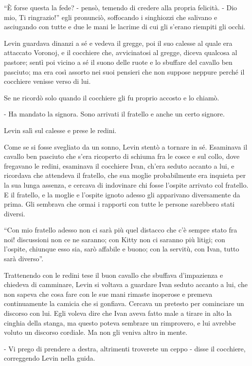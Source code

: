 ``È forse questa la fede? - pensò, temendo di credere alla propria felicità. - Dio mio, Ti ringrazio!'' egli pronunciò, soffocando i singhiozzi che salivano e asciugando con tutte e due le mani le lacrime di cui gli s'erano riempiti gli occhi. 

\label{xiv-7} 

Levin guardava dinanzi a sé e vedeva il gregge, poi il suo calesse al quale era attaccato Voronoj, e il cocchiere che, avvicinatosi al gregge, diceva qualcosa al pastore; sentì poi vicino a sé il suono delle ruote e lo sbuffare del cavallo ben pasciuto; ma era così assorto nei suoi pensieri che non suppose neppure perché il cocchiere venisse verso di lui. 

Se ne ricordò solo quando il cocchiere gli fu proprio accosto e lo chiamò. 

- Ha mandato la signora. Sono arrivati il fratello e anche un certo signore. 

Levin salì sul calesse e prese le redini. 

Come se si fosse svegliato da un sonno, Levin stentò a tornare in sé. Esaminava il cavallo ben pasciuto che s'era ricoperto di schiuma fra le cosce e sul collo, dove fregavano le redini, esaminava il cocchiere Ivan, ch'era seduto accanto a lui, e ricordava che attendeva il fratello, che sua moglie probabilmente era inquieta per la sua lunga assenza, e cercava di indovinare chi fosse l'ospite arrivato col fratello. E il fratello, e la moglie e l'ospite ignoto adesso gli apparivano diversamente da prima. Gli sembrava che ormai i rapporti con tutte le persone sarebbero stati diversi. 

``Con mio fratello adesso non ci sarà più quel distacco che c'è sempre stato fra noi! discussioni non ce ne saranno; con Kitty non ci saranno più litigi; con l'ospite, chiunque esso sia, sarò affabile e buono; con la servitù, con Ivan, tutto sarà diverso''. 

Trattenendo con le redini tese il buon cavallo che sbuffava d'impazienza e chiedeva di camminare, Levin si voltava a guardare Ivan seduto accanto a lui, che non sapeva che cosa fare con le sue mani rimaste inoperose e premeva continuamente la camicia che si gonfiava. Cercava un pretesto per cominciare un discorso con lui. Egli voleva dire che Ivan aveva fatto male a tirare in alto la cinghia della stanga, ma questo poteva sembrare un rimprovero, e lui avrebbe voluto un discorso cordiale. Ma non gli veniva altro in mente. 

- Vi prego di prendere a destra, altrimenti troverete un ceppo - disse il cocchiere, correggendo Levin nella guida. 

